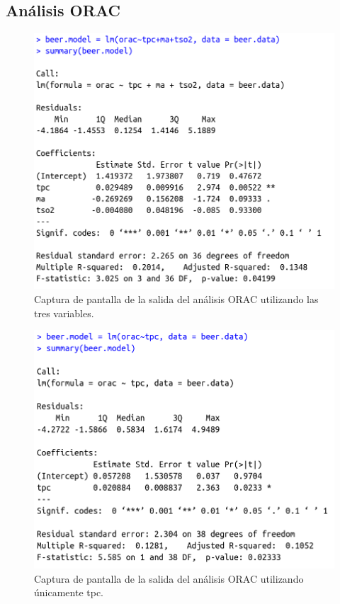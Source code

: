 \documentclass{article}
\begin{document}
\newpage
\subsection{Análisis ORAC}
\begin{figure}[htbp]
    \centering
    \includegraphics[scale=0.4]{images/orac_analisis_3_variables.png}
    \caption{Captura de pantalla de la salida del análisis ORAC utilizando las tres variables.}
    \label{fig:orac_3_variables}
\end{figure}

\begin{figure}[htbp]
    \centering
    \includegraphics[scale=0.4]{images/orac_1_variable_tpc.png}
    \caption{Captura de pantalla de la salida del análisis ORAC utilizando únicamente tpc.}
    \label{fig:orac_1_variable_tpc}
\end{figure}
\end{document}
